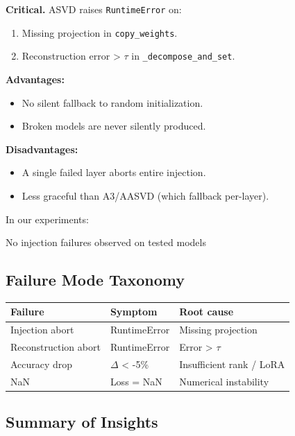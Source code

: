 \textbf{Critical.} ASVD raises \texttt{RuntimeError} on:

\begin{enumerate}
\item Missing projection in \texttt{copy\_weights}.
\item Reconstruction error > $\tau$ in \texttt{\_decompose\_and\_set}.

\end{enumerate}
\textbf{Advantages:}
\begin{itemize}
\item No silent fallback to random initialization.
\item Broken models are never silently produced.

\end{itemize}
\textbf{Disadvantages:}
\begin{itemize}
\item A single failed layer aborts entire injection.
\item Less graceful than A3/AASVD (which fallback per-layer).

\end{itemize}
In our experiments:

No injection failures observed on tested models

\subsection{Failure Mode Taxonomy}

\begin{table}[H]
\centering
\small
\begin{tabular}{lll}
\toprule
\textbf{Failure} & \textbf{Symptom} & \textbf{Root cause} \\
\midrule
Injection abort & RuntimeError & Missing projection \\
Reconstruction abort & RuntimeError & Error > $\tau$ \\
Accuracy drop & $\Delta$ < -5\% & Insufficient rank / LoRA \\
NaN & Loss = NaN & Numerical instability \\
\bottomrule
\end{tabular}
\end{table}

\subsection{Summary of Insights}


